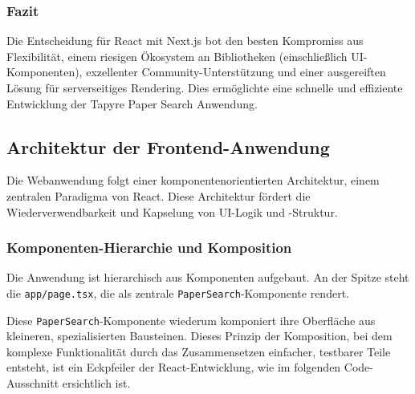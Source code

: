 \subsubsection{Fazit}
Die Entscheidung für React mit Next.js bot den besten Kompromiss aus Flexibilität, einem riesigen Ökosystem an Bibliotheken (einschließlich UI-Komponenten), exzellenter Community-Unterstützung und einer ausgereiften Lösung für serverseitiges Rendering. Dies ermöglichte eine schnelle und effiziente Entwicklung der Tapyre Paper Search Anwendung.

\subsection{Architektur der Frontend-Anwendung}
Die Webanwendung folgt einer komponentenorientierten Architektur, einem zentralen Paradigma von React. Diese Architektur fördert die Wiederverwendbarkeit und Kapselung von UI-Logik und -Struktur.

\subsubsection{Komponenten-Hierarchie und Komposition}
Die Anwendung ist hierarchisch aus Komponenten aufgebaut. An der Spitze steht die \texttt{app/page.tsx}, die als zentrale \texttt{PaperSearch}-Komponente rendert.



Diese \texttt{PaperSearch}-Komponente wiederum komponiert ihre Oberfläche aus kleineren, spezialisierten Bausteinen. Dieses Prinzip der Komposition, bei dem komplexe Funktionalität durch das Zusammensetzen einfacher, testbarer Teile entsteht, ist ein Eckpfeiler der React-Entwicklung, wie im folgenden Code-Ausschnitt ersichtlich ist.



